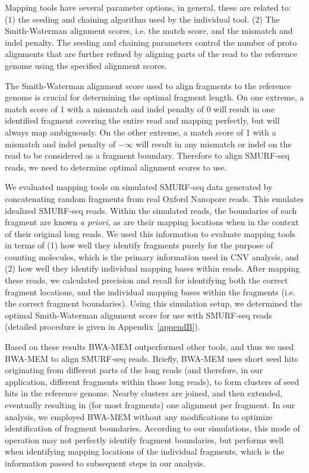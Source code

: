 Mapping tools have several parameter options, in general, these are
related to: (1) the seeding and chaining algorithm used by the
individual tool.  (2) The Smith-Waterman alignment scores, i.e. the
match score, and the mismatch and indel penalty. The seeding and
chaining parameters control the number of proto alignments that are
further refined by aligning parts of the read to the reference genome
using the specified alignment scores.

The Smith-Waterman alignment score used to align fragments to the
reference genome is crucial for determining the optimal fragment length.
On one extreme, a match score of 1 with a mismatch and indel penalty of
0 will result in one identified fragment covering the entire read and
mapping perfectly, but will always map ambiguously. On the other
extreme, a match score of 1 with a mismatch and indel penalty of
$-\infty$ will result in any mismatch or indel on the read to be
considered as a fragment boundary. Therefore to align SMURF-seq reads,
we need to determine optimal alignment scores to use.

We evaluated mapping tools on simulated SMURF-seq data generated by
concatenating random fragments from real Oxford Nanopore reads. This
emulates idealized SMURF-seq reads. Within the simulated reads, the
boundaries of each fragment are known \textit{a priori}, as are their
mapping locations when in the context of their original long reads. We
used this information to evaluate mapping tools in terms of (1) how well
they identify fragments purely for the purpose of counting molecules,
which is the primary information used in CNV analysis, and (2) how well
they identify individual mapping bases within reads. After mapping these
reads, we calculated precision and recall for identifying both the
correct fragment locations, and the individual mapping bases within the
fragments (i.e. the correct fragment boundaries). Using this simulation
setup, we determined the optimal Smith-Waterman alignment score for use
with SMURF-seq reads (detailed procedure is given in
Appendix~\ref{appendB}).

Based on these results BWA-MEM outperformed other tools, and thus we
used BWA-MEM to align SMURF-seq reads.
%
Briefly, BWA-MEM uses short seed hits originating from different parts of
the long reads (and therefore, in our application, different fragments
within those long reads), to form clusters of seed hits in the reference
genome. Nearby clusters are joined, and then extended, eventually
resulting in (for most fragments) one alignment per fragment.
%
In our analysis, we employed BWA-MEM without any modifications to
optimize identification of fragment boundaries.  According to our
simulations, this mode of operation may not perfectly identify fragment
boundaries, but performs well when identifying mapping locations of
the individual fragments, which is the information passed to subsequent
steps in our analysis.


